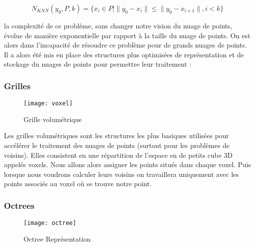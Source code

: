  $$ N_{KNN}(y_{0}, P, k) = \{x_{i} \in P | \|y_{0} - x_{i}\| \leq \|y_{0} - x_{i+1} \|, i<k\} $$
 
 
la complexité de ce problème, sans changer notre vision du nuage de points, évolue de manière exponentielle par rapport à la taille du nuage de points. On est alors dans l'incapacité de résoudre ce problème pour de grands nuages de points.
\newline
Il a alors été mis en place des structures plus optimisées de représentation et de stockage du nuages de points pour permettre leur traitement :

\subsubsection{Grilles}
\begin{wrapfigure}{r}{0.5\textwidth}
  \begin{center}
    \texttt{[image: voxel]}
  \end{center}
  \caption{Grille volumétrique}
\end{wrapfigure}
Les grilles volumétriques sont les structures les plus basiques utilisées pour accélérer le traitement des nuages de points (surtout pour les problèmes de voisins). Elles consistent en une répartition de l'espace en de petits cube 3D appelés voxels. Nous allons alors assigner les points situés dans chaque voxel. Puis lorsque nous voudrons calculer leurs voisins on travaillera uniquement avec les points associés au voxel où se trouve notre point.


\subsubsection{Octrees}

\begin{wrapfigure}{r}{0.2\textwidth}
  \begin{center}
    \texttt{[image: octree]}
  \end{center}
  \caption{Octree Représentation}
\end{wrapfigure}

